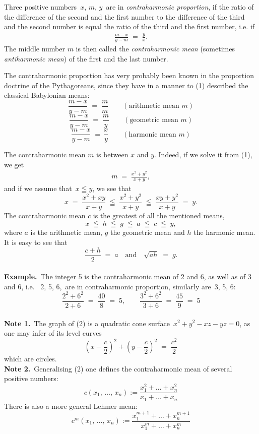 \documentclass[12pt]{article}
\theoremstyle{definition}
\begin{document}
Three positive numbers\, $x$, $m$, $y$\, are in {\em contraharmonic proportion}, if the ratio of the difference of the second and the first number to the difference of the third and the second number is equal the ratio of the third and the first number, i.e. if
\begin{align}
\frac{m\!-\!x}{y\!-\!m} \;=\; \frac{y}{x}.
\end{align}
The middle number $m$ is then called the {\em contraharmonic mean} (sometimes {\em antiharmonic mean}) of the first and the last number.

The contraharmonic proportion has very probably been known in the proportion doctrine of the Pythagoreans, since they have in a manner  to (1) described the classical Babylonian means:
$$\frac{m\!-\!x}{y\!-\!m} \;=\; \frac{m}{m} \qquad (\mbox{arithmetic mean }m)$$
$$\frac{m\!-\!x}{y\!-\!m} \;=\; \frac{m}{y} \qquad (\mbox{geometric mean }m)$$
$$\frac{m\!-\!x}{y\!-\!m} \;=\, \frac{x}{y} \qquad (\mbox{harmonic mean }m)$$

The contraharmonic mean $m$ is between $x$ and $y$. Indeed, if we solve it from (1), we get
\begin{align}
m \;=\; \frac{x^2\!+\!y^2}{x\!+\!y},
\end{align}
and if we assume that\, $x \leqq y$, we see that
$$x \;=\; \frac{x^2\!+\!xy}{x\!+\!y} \;\leqq\; \frac{x^2\!+\!y^2}{x\!+\!y}
\;\leqq\; \frac{xy\!+\!y^2}{x\!+\!y} \;=\; y.$$
The contraharmonic mean $c$ is the greatest of all the mentioned means,
$$x \;\leqq\; h \;\leqq\; g \;\leqq\; a \;\leqq\; c \;\leqq\; y,$$
where $a$ is the arithmetic mean, $g$ the geometric mean and $h$ the harmonic mean. It is easy to see that
$$\frac{c\!+\!h}{2} \;=\; a \quad\mbox{and}\quad \sqrt{ah} \;=\; g.$$\\

\textbf{Example.}\, The integer 5 is the contraharmonic mean of 2 and 6, as well as of 3 and 6, i.e. \,
2, 5, 6,\, are in contraharmonic proportion, similarly are\, 3, 5, 6:
$$\frac{2^2\!+\!6^2}{2\!+\!6} \;=\; \frac{40}{8} \;=\; 5, \qquad \frac{3^2\!+\!6^2}{3\!+\!6}
\;=\; \frac{45}{9} \;=\; 5$$\\

\textbf{Note 1.}\, The graph of (2) is a quadratic cone surface \,$x^2\!+\!y^2\!-xz\!-\!yz = 0$, as one may infer of its level curves
$$\left(x-\frac{c}{2}\right)^2+\left(y-\frac{c}{2}\right)^2 \;=\; \frac{c^2}{2}$$
which are circles.\\

\textbf{Note 2.}\, Generalising (2) one defines the contraharmonic mean of several positive numbers:
$$c(x_1,\,\ldots,\,x_n) := \frac{x_1^2\!+\ldots+\!x_n^2}{x_1\!+\ldots+\!x_n}$$
There is also a more general Lehmer mean:
$$c^m(x_1,\,\ldots,\,x_n) := \frac{x_1^{m+1}\!+\ldots+\!x_n^{m+1}}{x_1^m\!+\ldots+\!x_n^m}$$
\end{document}
